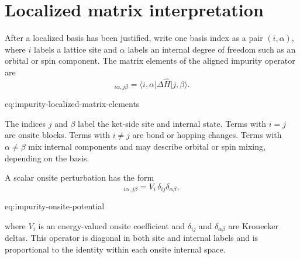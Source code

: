 \section{Localized matrix interpretation}

After a localized basis has been justified, write one basis index as a pair
$(i,\alpha)$, where $i$ labels a lattice site and $\alpha$ labels an internal
degree of freedom such as an orbital or spin component. The matrix elements of
the aligned impurity operator are
\begin{equation}
    [\Delta H]_{i\alpha,j\beta}
    =
    \langle i,\alpha\lvert
    \Delta\widehat H
    \rvert j,\beta\rangle.
    \label{eq:impurity-localized-matrix-elements}
\end{equation}
\begin{equationterms}{eq:impurity-localized-matrix-elements}
\end{equationterms}
The indices $j$ and $\beta$ label the ket-side site and internal state. Terms
with $i=j$ are onsite blocks. Terms with $i\neq j$ are bond or hopping changes.
Terms with $\alpha\neq\beta$ mix internal components and may describe orbital
or spin mixing, depending on the basis.

A scalar onsite perturbation has the form
\begin{equation}
    [\Delta H_{\mathrm{pot}}]_{i\alpha,j\beta}
    =
    V_i\,\delta_{ij}\delta_{\alpha\beta},
    \label{eq:impurity-onsite-potential}
\end{equation}
\begin{equationterms}{eq:impurity-onsite-potential}
\end{equationterms}
where $V_i$ is an energy-valued onsite coefficient and $\delta_{ij}$ and
$\delta_{\alpha\beta}$ are Kronecker deltas. This operator is diagonal in both
site and internal labels and is proportional to the identity within each
onsite internal space.

